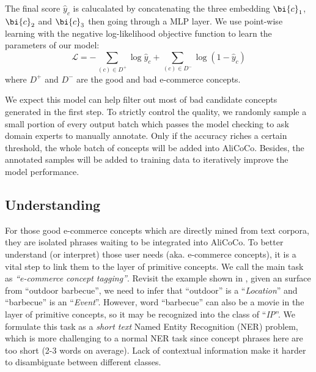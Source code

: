 The final score $\hat y_c$ is calucalated by concatenating the three embedding $\bi{c}_1$, $\bi{c}_2$ and $\bi{c}_3$ then going through a MLP layer.
We use point-wise learning with the negative log-likelihood objective function to learn the parameters of our model:
\begin{equation}
\mathscr{L} = -\sum_{(c)\in D^+}{\log \hat y_c} + \sum_{(c)\in D^-}{\log (1-\hat y_c)}
\end{equation}
where $D^+$ and $D^-$ are the good and bad e-commerce concepts.

We expect this model can help filter out most of bad candidate concepts generated in the first step.
To strictly control the quality, we randomly sample a small portion of every output batch which passes the model checking to ask domain experts to manually annotate.
Only if the accuracy riches a certain threshold,
the whole batch of concepts will be added into AliCoCo.
Besides, the annotated samples will be added to training data to iteratively improve the model performance.






\subsection{Understanding}
\label{sec:tagging}
For those good e-commerce concepts which are directly mined from text corpora,
they are isolated phrases waiting to be integrated into AliCoCo.
To better understand (or interpret) those user needs (aka. e-commerce concepts),
it is a vital step to link them to the layer of primitive concepts.
We call the main task as \textit{``e-commerce concept tagging''}.
Revisit the example shown in , 
given an surface from ``outdoor barbecue'', 
we need to infer that ``outdoor'' is a ``\textit{Location}'' and ``barbecue'' is an ``\textit{Event}''.
However, word ``barbecue'' can also be a movie in the layer of primitive concepts, so it may be recognized into the class of ``\textit{IP}''.
We formulate this task as a \textit{short text} Named Entity Recognition (NER) problem, which is more challenging to a normal NER task since
concept phrases here are too short (2-3 words on average).
Lack of contextual information make it harder to disambiguate between different classes.

